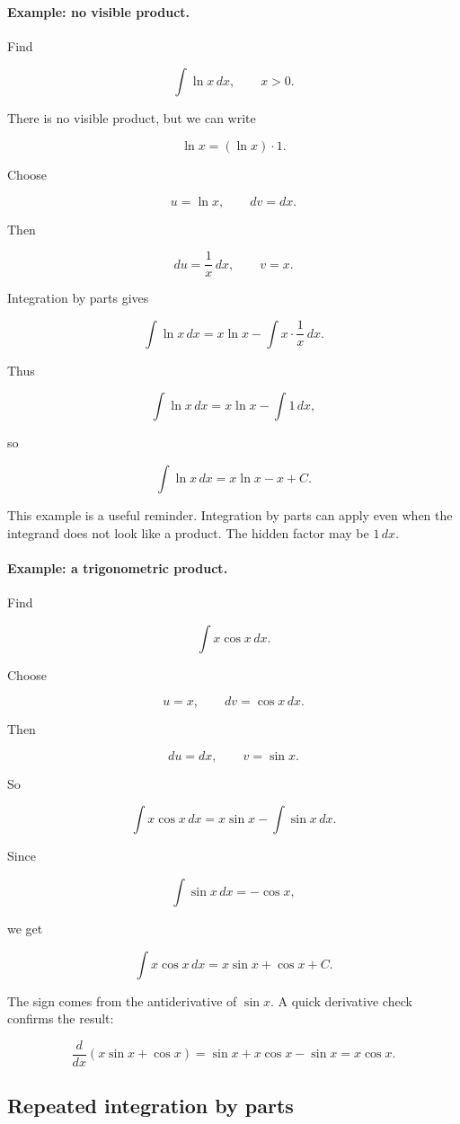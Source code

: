 \paragraph{Example: no visible product.}
Find

\[
\int \ln x\,dx,
\qquad x>0.
\]

There is no visible product, but we can write

\[
\ln x=(\ln x)\cdot 1.
\]

Choose

\[
u=\ln x,
\qquad
dv=dx.
\]

Then

\[
du=\frac1x\,dx,
\qquad
v=x.
\]

Integration by parts gives

\[
\int \ln x\,dx
=
x\ln x-\int x\cdot \frac1x\,dx.
\]

Thus

\[
\int \ln x\,dx
=
x\ln x-\int 1\,dx,
\]

so

\[
\boxed{
\int \ln x\,dx=x\ln x-x+C.
}
\]

This example is a useful reminder.  Integration by parts can apply even when the
integrand does not look like a product.  The hidden factor may be \(1\,dx\).

\paragraph{Example: a trigonometric product.}
Find

\[
\int x\cos x\,dx.
\]

Choose

\[
u=x,
\qquad
dv=\cos x\,dx.
\]

Then

\[
du=dx,
\qquad
v=\sin x.
\]

So

\[
\int x\cos x\,dx
=
x\sin x-\int \sin x\,dx.
\]

Since

\[
\int \sin x\,dx=-\cos x,
\]

we get

\[
\boxed{
\int x\cos x\,dx=x\sin x+\cos x+C.
}
\]

The sign comes from the antiderivative of \(\sin x\).  A quick derivative check confirms
the result:

\[
\frac{d}{dx}(x\sin x+\cos x)
=
\sin x+x\cos x-\sin x
=
x\cos x.
\]

\subsection{Repeated integration by parts}
\label{subsec:repeated-integration-by-parts}

